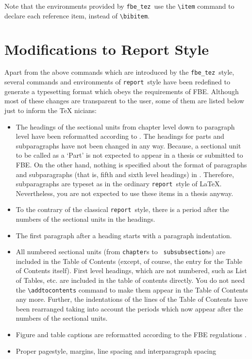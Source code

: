\documentclass[12pt]{article}
\newcommand\fbe{{\tt fbe\_tez}}
\newcommand\report{{\tt report}}
\begin{document}
Note that the environments provided by \fbe\ use the \verb/\item/
command to declare each reference item, instead of \verb/\bibitem/.

\section{Modifications to Report Style}
Apart from the above commands which are introduced by the \fbe\ style,
several commands and environments of \report\ style have been
redefined to generate a typesetting format which obeys the
requirements of FBE. Although most of these changes are transparent to
the user, some of them are listed below just to inform the \TeX
nicians:
\begin{itemize}
\item The headings of the sectional units from chapter level down to
  paragraph level have been reformatted according to \cite{fbeman}.
  The headings for parts and subparagraphs have not been changed in
  any way. Because, a sectional unit to be called as a `Part' is not
  expected to appear in a thesis or submitted to FBE. On
  the other hand, nothing is specified about the format of paragraphs
  and subparagraphs (that is, fifth and sixth level headings) in
  \cite{fbeman}. Therefore, subparagraphs are typeset as in the
  ordinary \report\ style of \LaTeX. Nevertheless, you are not
  expected to use these items in a thesis anyway.
\item To the contrary of the classical \report\ style, there is a
  period after the numbers of the sectional units in the headings.
\item The first paragraph after a heading starts with a paragraph
  indentation.
\item All numbered sectional units (from {\tt chapter}s to {\tt
  subsubsection}s) are included in the Table of Contents (except,
  of course, the entry for the Table of Contents itself). First level
  headings, which are not numbered, such as List of Tables, etc. are
  included in the table of contents directly. You do not need the
  \verb/\addtocontents/ command to make them appear in the Table of
  Contents any more. Further, the indentations of the lines of the
  Table of Contents have been rearranged taking into account the
  periods which now appear after the numbers of the sectional units.
\item Figure and table captions are reformatted according to the FBE
  regulations \cite{fbeman}.
\item Proper pagestyle, margins, line spacing and interparagraph spacing

\end{itemize}
\end{document}

